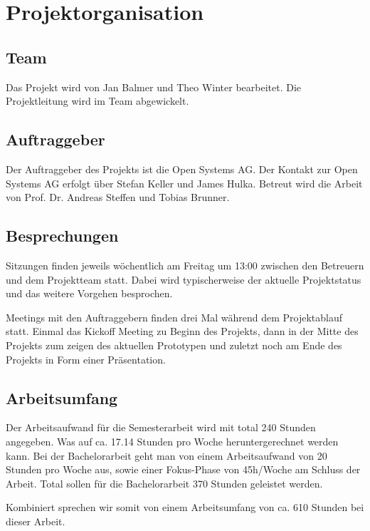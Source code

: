 \section{Projektorganisation}
\label{sec:Projektorganisation}

\subsection{Team}
Das Projekt wird von Jan Balmer und Theo Winter bearbeitet. Die Projektleitung wird im Team abgewickelt.

\subsection{Auftraggeber}
Der Auftraggeber des Projekts ist die Open Systems AG. Der Kontakt zur Open Systems AG erfolgt über Stefan Keller und James Hulka. Betreut wird die Arbeit von Prof. Dr. Andreas Steffen und Tobias Brunner.

\subsection{Besprechungen}
Sitzungen finden jeweils wöchentlich am Freitag um 13:00 zwischen den Betreuern und dem Projektteam statt. Dabei wird typischerweise der aktuelle Projektstatus und das weitere Vorgehen besprochen.

Meetings mit den Auftraggebern finden drei Mal während dem Projektablauf statt. Einmal das Kickoff Meeting zu Beginn des Projekts, dann in der Mitte des Projekts zum zeigen des aktuellen Prototypen und zuletzt noch am Ende des Projekts in Form einer Präsentation.

\subsection{Arbeitsumfang}
Der Arbeitsaufwand für die Semesterarbeit wird mit total 240 Stunden angegeben. Was auf ca. 17.14 Stunden pro Woche heruntergerechnet werden kann.
Bei der Bachelorarbeit geht man von einem Arbeitsaufwand von 20 Stunden pro Woche aus, sowie einer Fokus-Phase von 45h/Woche am Schluss der Arbeit. Total sollen für die Bachelorarbeit 370 Stunden geleistet werden.

Kombiniert sprechen wir somit von einem Arbeitsumfang von ca. 610 Stunden bei dieser Arbeit.